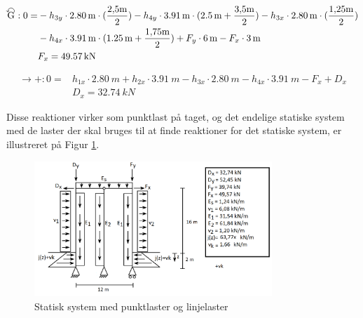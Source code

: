 \begin{equation}
\begin{split}
	\ALN{\text{G}}: 0 = & - h_{3y} \cdot \SI{2,80}{m} \cdot (\frac{2,\!5 \text{m}}{2}) - h_{4y} \cdot \SI{3,91}{m} \cdot (\SI{2,5}{m} + \frac{3,\!5 \text{m}}{2}) - h_{3x} \cdot \SI{2,80}{m} \cdot (\frac{1,\!25 \text{m}}{2}) \\& - h_{4x} \cdot \SI{3,91}{m} \cdot (\SI{1,25}{m} + \frac{1,\!75 \text{m}}{2}) + F_y \cdot \SI{6}{m} - F_x \cdot \SI{3}{m}
	\\ &
	F_x = \SI{49,57}{kN}
\end{split}
\end{equation}

\begin{equation}
\begin{split}
	\rightarrow+: 0 = & h_{1x} \cdot \SI{2,80}{m} + h_{2x} \cdot \SI{3,91}{m} - h_{3x} \cdot \SI{2,80}{m} - h_{4x} \cdot \SI{3,91}{m} - F_x + D_x
	\\ &
	D_x = \SI{32,74}{kN} 
\end{split}
\end{equation}

Disse reaktioner virker som punktlast på taget, og det endelige statiske system med de laster der skal bruges til at finde reaktioner for det statiske system, er illustreret på Figur \ref{fig:alle}. 

\begin{figure}[htbp]
	\centering
	\includegraphics[width=0.8\textwidth]{billeder/endeligesystemmedlaster.png}
	\caption{Statisk system med punktlaster og linjelaster}
	\label{fig:alle}
\end{figure}